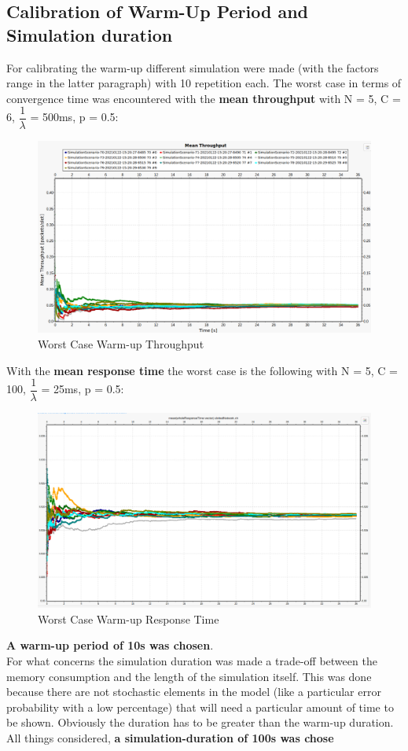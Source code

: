 \subsection{Calibration of Warm-Up Period and Simulation duration}
For calibrating the warm-up different simulation were made (with the factors range in the latter paragraph) with 10 repetition each. 
The worst case in terms of convergence time was encountered with the \textbf{mean throughput} with N = 5, C = 6, $\dfrac{1}{\lambda}$ = 500ms, p = 0.5:
\begin{figure}[H]
	\centering
	\includegraphics[width=\textwidth]{img/WorstCaseWarmUp.png}
	\caption{Worst Case Warm-up Throughput}
	\label {img: warmUp}
\end{figure}  
With the \textbf{mean response time} the worst case is the following with N = 5, C = 100, $\dfrac{1}{\lambda}$ = 25ms, p = 0.5:
\begin{figure}[H]
	\centering
	\includegraphics[width=\textwidth]{img/WorstResponseTime.png}
	\caption{Worst Case Warm-up Response Time}
	\label {img: ResponsewarmUp}
\end{figure}  
\noindent\textbf{A warm-up period of 10s was chosen}.\\
For what concerns the simulation duration was made a trade-off between the memory consumption and the length of the simulation itself. This was done because there are not stochastic elements in the model (like a particular error probability with a low percentage) that will need a particular amount of time to be shown. Obviously the duration has to be greater than the warm-up duration. All things considered, \textbf{a simulation-duration of 100s was chose}

